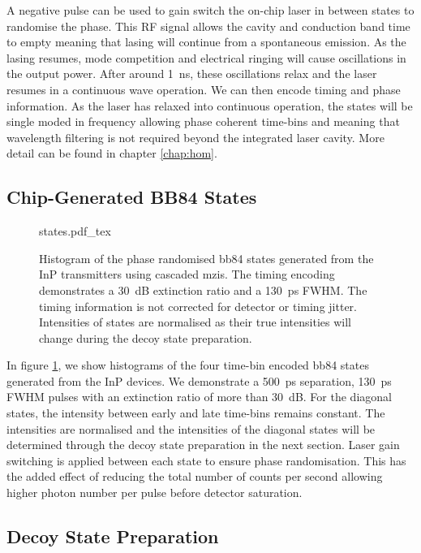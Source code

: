 A negative pulse can be used to gain switch the on-chip laser in between states to randomise the phase. This RF signal allows the cavity and conduction band time to empty meaning that lasing will continue from a spontaneous emission. As the lasing resumes, mode competition and electrical ringing will cause oscillations in the output power. After around \SI{1}{ns}, these oscillations relax and the laser resumes in a continuous wave operation. We can then encode timing and phase information. As the laser has relaxed into continuous operation, the states will be single moded in frequency allowing phase coherent time-bins and meaning that wavelength filtering is not required beyond the integrated laser cavity. More detail can be found in chapter \ref{chap:hom}.

\subsection{Chip-Generated BB84 States}

\begin{figure}[t]
	\centering
	\small
	\def\svgwidth{0.9\textwidth} 
	{states.pdf_tex}
	\caption[Phase randomised BB84 states generated from the InP transmitters]{Histogram of the phase randomised \acs{bb84} states generated from the \ac{InP} transmitters using cascaded \acfp{mzi}. The timing encoding demonstrates a \SI{30}{dB} extinction ratio and a \SI{130}{\ps} \acs{FWHM}. The timing information is not corrected for detector or timing jitter. Intensities of states are normalised as their true intensities will change during the decoy state preparation.}
	\label{fig:states}
\end{figure}

In figure \ref{fig:states}, we show histograms of the four time-bin encoded \ac{bb84} states generated from the \ac{InP} devices. We demonstrate a \SI{500}{ps} separation, \SI{130}{ps} \ac{FWHM} pulses with an extinction ratio of more than \SI{30}{dB}. For the diagonal states, the intensity between early and late time-bins remains constant. The intensities are normalised and the intensities of the diagonal states will be determined through the decoy state preparation in the next section. Laser gain switching is applied between each state to ensure phase randomisation. This has the added effect of reducing the total number of counts per second allowing higher photon number per pulse before detector saturation.

\subsection{Decoy State Preparation}

